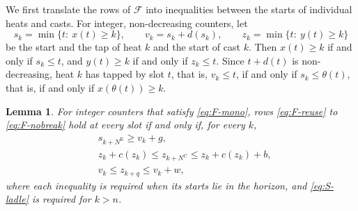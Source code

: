 \documentclass[11pt]{article}
\newtheorem{lemma}{Lemma}
\newcommand{\NE}{N^{\mathrm{E}}}
\newcommand{\NC}{N^{\mathrm{C}}}
\newcommand{\calF}{\mathcal{F}}
\begin{document}
We first translate the rows of $\calF$ into inequalities between the starts of individual heats and casts. For
integer, non-decreasing counters, let
\begin{equation}\label{eq:order}
s_k=\min\{t:\ x(t)\ge k\},\qquad v_k=s_k+d(s_k),\qquad z_k=\min\{t:\ y(t)\ge k\}
\end{equation}
be the start and the tap of heat $k$ and the start of cast $k$. Then $x(t)\ge k$ if and only if $s_k\le t$, and
$y(t)\ge k$ if and only if $z_k\le t$. Since $t+d(t)$ is non-decreasing, heat $k$ has tapped by slot $t$, that is,
$v_k\le t$, if and only if $s_k\le\theta(t)$, that is, if and only if $x(\theta(t))\ge k$.

\begin{lemma}\label{lem:order-stat}
For integer counters that satisfy \eqref{eq:F-mono}, rows \eqref{eq:F-reuse} to \eqref{eq:F-nobreak} hold at every slot
if and only if, for every $k$,
\begin{subequations}\label{eq:S}
\begin{align}
& s_{k+\NE}\ge v_k+g, \label{eq:S-furn}\\
& z_k+c(z_k)\le z_{k+\NC}\le z_k+c(z_k)+b, \label{eq:S-cast}\\
& v_k\le z_{k+q}\le v_k+w, \label{eq:S-ladle}
\end{align}
\end{subequations}
where each inequality is required when its starts lie in the horizon, and \eqref{eq:S-ladle} is required for $k>n$.
\end{lemma}
\end{document}
